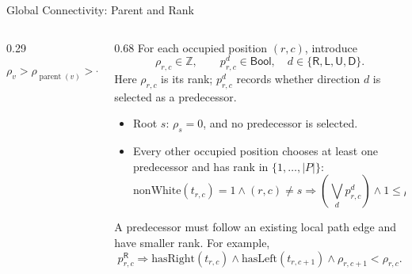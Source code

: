 \documentclass[aspectratio=169,10pt]{beamer}
\newcommand{\kind}[1]{\mathsf{#1}}
\begin{document}
\begin{frame}{Global Connectivity: Parent and Rank}
  \begin{columns}[c,totalwidth=\textwidth]
    \begin{column}{0.29\textwidth}
      \centering
      \resizebox{!}{4.95cm}{%
      }

      \[
        \rho_v >
        \rho_{\operatorname{parent}(v)} >
        \cdots >
        \rho_s=0
      \]
    \end{column}
    \begin{column}{0.68\textwidth}
      For each occupied position \((r,c)\), introduce
      \[
        \rho_{r,c}\in\mathbb Z,
        \qquad
        p^d_{r,c}\in\mathsf{Bool},
        \quad
        d\in\{\kind{R},\kind{L},\kind{U},\kind{D}\}.
      \]
      Here \(\rho_{r,c}\) is its rank; \(p^d_{r,c}\) records whether
      direction \(d\) is selected as a predecessor.

      \begin{itemize}
        \item Root \(s\): \(\rho_s=0\), and no predecessor is selected.
        \item Every other occupied position chooses at least one
          predecessor and has rank in \(\{1,\ldots,|P|\}\):
          \[
            \mathrm{nonWhite}(t_{r,c})=1\wedge(r,c)\ne s
            \Longrightarrow
            \left(\bigvee_d p^d_{r,c}\right)
            \wedge 1\le\rho_{r,c}\le |P|.
          \]
      \end{itemize}

      A predecessor must follow an existing local path edge and have
      smaller rank. For example,
      \[
        p^{\kind{R}}_{r,c}\Longrightarrow
        \mathrm{hasRight}(t_{r,c})
        \wedge\mathrm{hasLeft}(t_{r,c+1})
        \wedge\rho_{r,c+1}<\rho_{r,c}.
      \]
    \end{column}
  \end{columns}
\end{frame}
\end{document}
